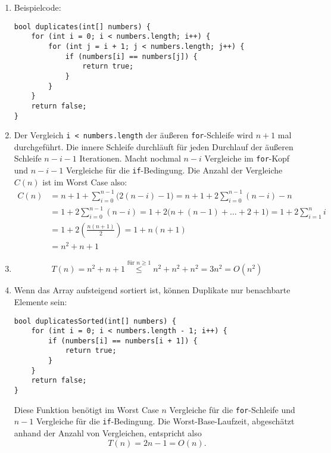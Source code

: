 \documentclass[11pt,a4paper]{article}
\begin{document}
\begin{loesung}
    
\begin{enumerate}
    \item Beispielcode:
    \begin{lstlisting}
bool duplicates(int[] numbers) {
    for (int i = 0; i < numbers.length; i++) {
        for (int j = i + 1; j < numbers.length; j++) {
            if (numbers[i] == numbers[j]) {
                return true;
            }
        }
    }
    return false;
}
    \end{lstlisting}

    \item
    Der Vergleich \texttt{i < numbers.length} der äußeren \texttt{for}-Schleife wird $n + 1$ mal durchgeführt.
    Die innere Schleife durchläuft für jeden Durchlauf der äußeren Schleife $n - i - 1$ Iterationen. Macht nochmal $n - i$ Vergleiche im \glqq{}\texttt{for}-Kopf\grqq{} und $n - i - 1$ Vergleiche für die \texttt{if}-Bedingung. Die Anzahl der Vergleiche $C(n)$ ist im Worst Case also:
    \begin{align}
        C(n) &= n + 1 + \sum\limits_{i = 0}^{n - 1} \big(2(n - i) - 1 \big)
        = n + 1 + 2\sum\limits_{i = 0}^{n - 1} (n - i) - n \\
        &=1 + 2\sum\limits_{i = 0}^{n - 1} (n - i)
        = 1 + 2\big(n + (n-1) + \ldots + 2 + 1\big) = 1 + 2\sum\limits_{i = 1}^{n} i \\
        &= 1 + 2\left( \frac{n(n + 1)}{2} \right) = 1 + n(n+1) \\
        &= n^2 + n + 1
    \end{align}

    \item 
    \begin{equation}
        T(n) = n^2 + n + 1 \overset{\text{für }n \geq 1}{\leq} n^2 + n^2 + n^2 = 3 n^2 = O(n^2)
    \end{equation}
    
    \item Wenn das Array aufsteigend sortiert ist, können Duplikate nur benachbarte Elemente sein:
\begin{lstlisting}
bool duplicatesSorted(int[] numbers) {
    for (int i = 0; i < numbers.length - 1; i++) {
        if (numbers[i] == numbers[i + 1]) {
            return true;
        }
    }
    return false;
}
\end{lstlisting}
Diese Funktion benötigt im Worst Case $n$ Vergleiche für die \texttt{for}-Schleife und $n - 1$ Vergleiche für die \texttt{if}-Bedingung.
Die Worst-Base-Laufzeit, abgeschätzt anhand der Anzahl von Vergleichen, entspricht also
\begin{equation}
    T(n) = 2n - 1 = O(n).
\end{equation}

\end{enumerate}
\end{loesung}
\end{document}
